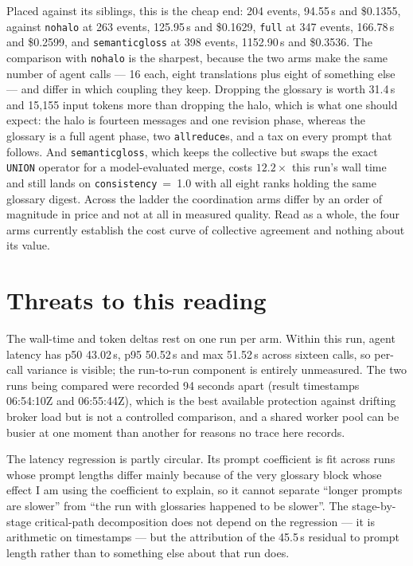 \documentclass[11pt]{article}
\begin{document}
Placed against its siblings, this is the cheap end: 204 events, 94.55\,s and \$0.1355, against
\texttt{nohalo} at 263 events, 125.95\,s and \$0.1629, \texttt{full} at 347 events, 166.78\,s and
\$0.2599, and \texttt{semanticgloss} at 398 events, 1152.90\,s and \$0.3536. The comparison with
\texttt{nohalo} is the sharpest, because the two arms make the same number of agent calls --- 16
each, eight translations plus eight of something else --- and differ in which coupling they keep.
Dropping the glossary is worth 31.4\,s and 15{,}155 input tokens more than dropping the halo,
which is what one should expect: the halo is fourteen messages and one revision phase, whereas the
glossary is a full agent phase, two \texttt{allreduce}s, and a tax on every prompt that follows.
And \texttt{semanticgloss}, which keeps the collective but swaps the exact \texttt{UNION} operator
for a model-evaluated merge, costs $12.2\times$ this run's wall time and still lands on
\texttt{consistency}~=~1.0 with all eight ranks holding the same glossary digest. Across the ladder
the coordination arms differ by an order of magnitude in price and not at all in measured quality.
Read as a whole, the four arms currently establish the cost curve of collective agreement and
nothing about its value.

\section{Threats to this reading}

The wall-time and token deltas rest on one run per arm. Within this run, agent latency has p50
43.02\,s, p95 50.52\,s and max 51.52\,s across sixteen calls, so per-call variance is visible; the
run-to-run component is entirely unmeasured. The two runs being compared were recorded 94 seconds
apart (result timestamps 06:54:10Z and 06:55:44Z), which is the best available protection against
drifting broker load but is not a controlled comparison, and a shared worker pool can be busier at
one moment than another for reasons no trace here records.

The latency regression is partly circular. Its prompt coefficient is fit across runs whose prompt
lengths differ mainly because of the very glossary block whose effect I am using the coefficient
to explain, so it cannot separate ``longer prompts are slower'' from ``the run with glossaries
happened to be slower''. The stage-by-stage critical-path decomposition does not depend on the
regression --- it is arithmetic on timestamps --- but the attribution of the 45.5\,s residual to
prompt length rather than to something else about that run does.
\end{document}
